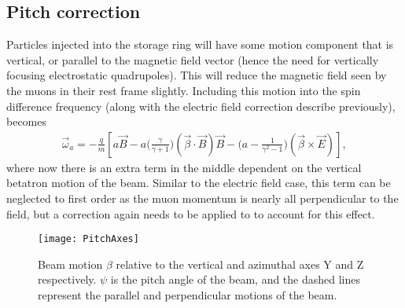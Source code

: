 \subsection{Pitch correction}
\label{sub:pitch_correction}

Particles injected into the \gmtwo storage ring will have some motion component that is vertical, or parallel to the magnetic field vector (hence the need for vertically focusing electrostatic quadrupoles). This will reduce the magnetic field seen by the muons in their rest frame slightly. Including this motion into the spin difference frequency (along with the electric field correction describe previously), \wa becomes
        \begin{align} \label{eq:wafinal}
            \vec{\omega}_{a} = -\frac{q}{m} [a\vec{B} - a \Big(\frac{\gamma}{\gamma+1}\Big)(\vec{\beta} \cdot \vec{B})\vec{B} - \Big(a - \frac{1}{\gamma^{2}-1}\Big)(\vec{\beta} \times \vec{E}) ],
        \end{align}
where now there is an extra term in the middle dependent on the vertical betatron motion of the beam. Similar to the electric field case, this term can be neglected to first order as the muon momentum is nearly all perpendicular to the field, but a correction again needs to be applied to \wa to account for this effect.

\begin{figure}[]
    \centering
    \texttt{[image: PitchAxes]}
    \caption[Pitching beam motion]{Beam motion $\beta$ relative to the vertical and azimuthal axes Y and Z respectively. $\psi$ is the pitch angle of the beam, and the dashed lines represent the parallel and perpendicular motions of the beam.}   
    \label{fig:PitchAxes}
\end{figure}

